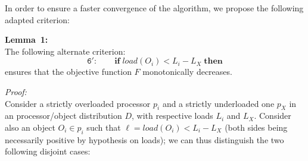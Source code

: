 In order to ensure a faster convergence of the algorithm, we propose
the following adapted criterion:
\par\textbf{Lemma~1:}\\
The following alternate criterion:
\[
\mathtt{6':} \qquad \mathrm{\mathbf{if}} \; load(O_i) < L_i - L_X
\; \mathrm{\mathbf{then}}
\] 
ensures that the objective function $F$ monotonically decreases.
\par\textit{Proof:}\\
Consider a strictly overloaded processor $p_i$ and a strictly
underloaded one $p_X$ in an processor/object distribution $D$, with
respective loads $L_i$ and $L_X$.
Consider also an object $O_i\in{p_i}$ such that $\ell=load(O_i) <
L_i-L_X$ (both sides being necessarily positive by hypothesis on
loads); we can thus distinguish the two following disjoint cases:

